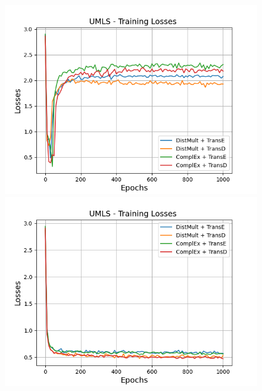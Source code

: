 \begin{figure}
    \centering
    \begin{minipage}{.5\textwidth}
      \centering
      \includegraphics[width=0.9\linewidth]{figures/results/gan_train/not_pretrained/uncertainty/max/entropy/umls/1k_epochs/uncertainty_umls_losses.png}
    \end{minipage}%
    \begin{minipage}{.5\textwidth}
      \centering
      \includegraphics[width=0.9\linewidth]{figures/results/gan_train/not_pretrained/uncertainty/max_distribution/entropy/umls/1k_epochs/uncertainty_umls_losses.png}
    \end{minipage}
    \begin{minipage}{.5\textwidth}
      \centering

\end{minipage}
\end{figure}
